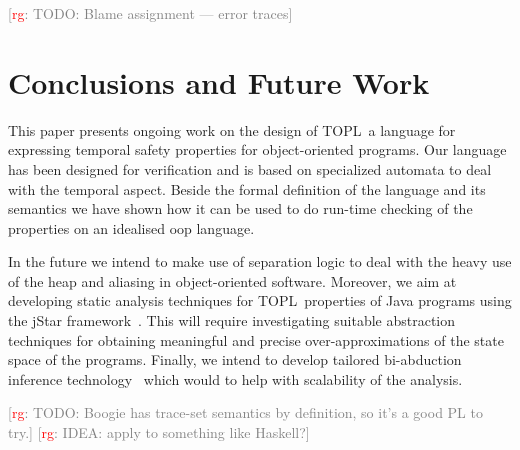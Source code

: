 \documentclass[preprint]{sigplanconf} %
\newcommand{\TPL}{TOPL}
\newcommand{\note}[2]{\textcolor{gray}{[\textcolor{red}{#1}: #2]}}
\newcommand{\rg}[1]{\note{rg}{#1}}
\theoremstyle{definition}
\theoremstyle{remark}
\begin{document}
\rg{TODO: Blame assignment --- error traces}


\section{Conclusions and Future Work}\label{sec:conclusions} %
This paper presents ongoing work on the design of  \TPL \ a language for expressing temporal safety properties for object-oriented programs.
Our language has been designed for verification and is based on specialized automata to deal with the temporal aspect.
Beside the formal definition of the language and its semantics we have shown how it can be used to do run-time checking of the properties
on an idealised oop language.

In the future we intend to make use of  separation logic to deal with the  heavy use of the heap and aliasing in object-oriented software. Moreover, we aim at developing static analysis techniques for \TPL \ properties of Java programs using the jStar framework~\cite{DBLP:conf/oopsla/DistefanoP08}.
This will require investigating suitable abstraction techniques for obtaining meaningful and precise over-approximations
of the state space of the programs. Finally, we intend to develop tailored bi-abduction inference technology~\cite{dblp:conf/popl/CalcagnoDOY09} which would to help with scalability of the analysis.

\rg{TODO: Boogie has trace-set semantics by definition, so it's a good PL to try.}
\rg{IDEA: apply to something like Haskell?}


\softraggedright


\end{document}
